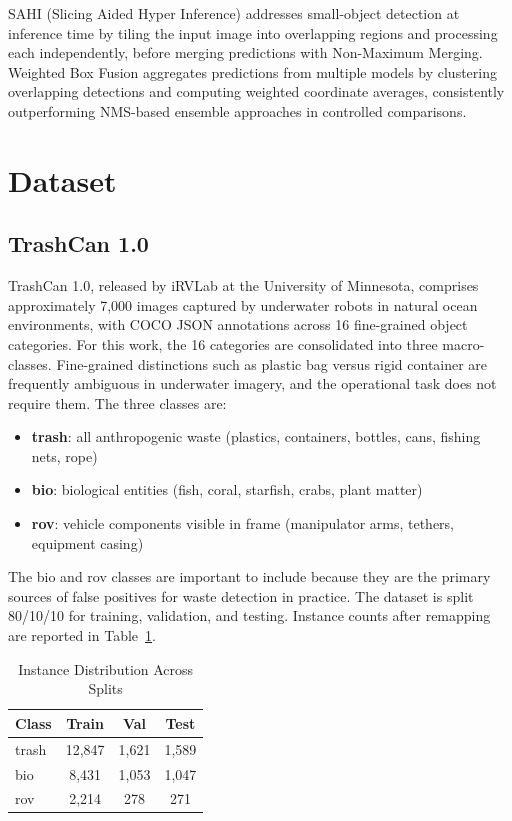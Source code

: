 \documentclass[conference]{IEEEtran}
\begin{document}
SAHI (Slicing Aided Hyper Inference) \cite{b7} addresses small-object
detection at inference time by tiling the input image into overlapping
regions and processing each independently, before merging predictions with
Non-Maximum Merging. Weighted Box Fusion \cite{b8} aggregates predictions
from multiple models by clustering overlapping detections and computing
weighted coordinate averages, consistently outperforming NMS-based ensemble
approaches in controlled comparisons.


\section{Dataset}

\subsection{TrashCan 1.0}

TrashCan 1.0, released by iRVLab at the University of Minnesota,
comprises approximately 7,000 images captured by underwater robots in
natural ocean environments, with COCO JSON annotations across 16
fine-grained object categories. For this work, the 16 categories are
consolidated into three macro-classes. Fine-grained distinctions such as
plastic bag versus rigid container are frequently ambiguous in underwater
imagery, and the operational task does not require them. The three classes
are:

\begin{itemize}
    \item \textbf{trash}: all anthropogenic waste (plastics, containers,
          bottles, cans, fishing nets, rope)
    \item \textbf{bio}: biological entities (fish, coral, starfish, crabs,
          plant matter)
    \item \textbf{rov}: vehicle components visible in frame (manipulator
          arms, tethers, equipment casing)
\end{itemize}

The bio and rov classes are important to include because they are the
primary sources of false positives for waste detection in practice. The
dataset is split 80/10/10 for training, validation, and testing.
Instance counts after remapping are reported in Table~\ref{tab:class_dist}.

\begin{table}[htbp]
\caption{Instance Distribution Across Splits}
\label{tab:class_dist}
\begin{center}
\begin{tabular}{lccc}
\toprule
\textbf{Class} & \textbf{Train} & \textbf{Val} & \textbf{Test} \\
\midrule
trash & 12,847 & 1,621 & 1,589 \\
bio   &  8,431 & 1,053 & 1,047 \\
rov   &  2,214 &   278 &   271 \\
\bottomrule
\end{tabular}
\end{center}
\end{table}
\end{document}
